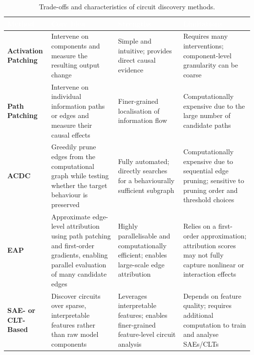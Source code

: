 \begin{table}[tb]
\centering
\caption{Trade-offs and characteristics of circuit discovery methods.}
\label{tab:circuit-methods}
\renewcommand{\arraystretch}{1.3}
\begin{tabular}{>{\raggedright\arraybackslash}p{2.3cm} >{\raggedright\arraybackslash}p{2.8cm} >{\raggedright\arraybackslash}p{2.8cm} >{\raggedright\arraybackslash}p{2.8cm}}
\toprule
\rowcolor{tableheader!80} \textcolor{white}{\textbf{Method}} & \textcolor{white}{\textbf{Core Idea}} & \textcolor{white}{\textbf{Strengths}} & \textcolor{white}{\textbf{Limitations}} \\
\midrule
\rowcolor{tablerow1} \textbf{Activation Patching}
& Intervene on components and measure the resulting output change
& Simple and intuitive; provides direct causal evidence
& Requires many interventions; component-level granularity can be coarse \\

\rowcolor{tablerow2} \textbf{Path Patching}
& Intervene on individual information paths or edges and measure their causal effects
& Finer-grained localisation of information flow
& Computationally expensive due to the large number of candidate paths \\

\rowcolor{tablerow1} \textbf{ACDC}
& Greedily prune edges from the computational graph while testing whether the target behaviour is preserved
& Fully automated; directly searches for a behaviourally sufficient subgraph
& Computationally expensive due to sequential edge pruning; sensitive to pruning order and threshold choices \\

\rowcolor{tablerow2} \textbf{EAP}
& Approximate edge-level attribution using path patching and first-order gradients, enabling parallel evaluation of many candidate edges
& Highly parallelisable and computationally efficient; enables large-scale edge attribution
& Relies on a first-order approximation; attribution scores may not fully capture nonlinear or interaction effects \\

\rowcolor{tablerow1} \textbf{SAE- or CLT-Based}
& Discover circuits over sparse, interpretable features rather than raw model components
& Leverages interpretable features; enables finer-grained feature-level circuit analysis
& Depends on feature quality; requires additional computation to train and analyse SAEs/CLTs \\
\bottomrule
\end{tabular}
\end{table}

